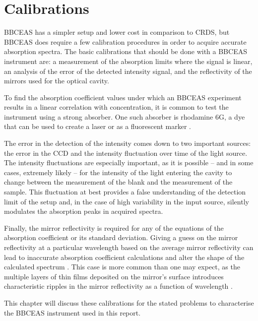 \chapter{Calibrations}\label{chap:calibration}

\acl{BBCEAS} has a simpler setup and lower cost in comparison to \ac{CRDS}, but
\ac{BBCEAS} does require a few calibration procedures in order to acquire
accurate absorption spectra. The basic calibrations that should be done with a
\ac{BBCEAS} instrument are: a measurement of the absorption limits where the
signal is linear, an analysis of the error of the detected intensity signal,
and the reflectivity of the mirrors used for the optical cavity.

To find the absorption coefficient values under which an \ac{BBCEAS} experiment
results in a linear correlation with concentration, it is common to test the
instrument using a strong absorber. One such absorber is rhodamine 6G, a dye
that can be used to create a laser \cite{Pappalardo:1970hi} or as a fluorescent
marker \cite{Gear:1974tf}.

The error in the detection of the intensity comes down to two important
sources: the error in the \ac{CCD} and the intensity fluctuation over time of
the light source. The intensity fluctuations are especially important, as it is
possible -- and in some cases, extremely likely -- for the intensity of the
light entering the cavity to change between the measurement of the blank and
the measurement of the sample. This fluctuation at best provides a false
understanding of the detection limit of the setup and, in the case of high
variability in the input source, silently modulates the absorption peaks in
acquired spectra.

Finally, the mirror reflectivity is required for any of the equations of the
absorption coefficient or its standard deviation. Giving a guess on the mirror
reflectivity at a particular wavelength based on the average mirror
reflectivity can lead to inaccurate absorption coefficient calculations and
alter the shape of the calculated spectrum \cite{Berden:2009wk}. This case is
more common than one may expect, as the multiple layers of thin films deposited
on the mirror's surface introduces characteristic ripples in the mirror
reflectivity as a function of wavelength \cite{Islam:2007ea}.

This chapter will discuss these calibrations for the stated problems to
characterise the \ac{BBCEAS} instrument used in this report.



